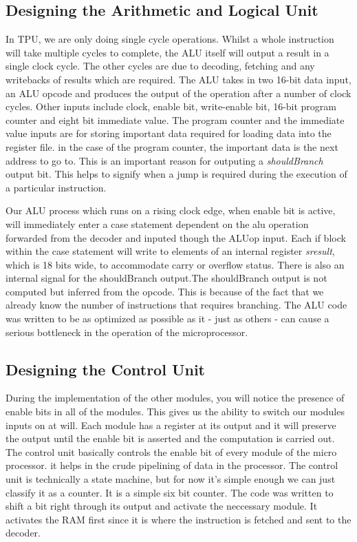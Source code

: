 \subsection{Designing the Arithmetic and Logical Unit}

In TPU, we are only doing single cycle operations. Whilst a whole instruction will take multiple cycles to complete, the ALU itself will output a result in a single clock cycle. The other cycles are due to decoding, fetching and any writebacks of results which are required. The ALU takes in two 16-bit data input, an ALU opcode and produces the output of the operation after a number of clock cycles. 
Other inputs include clock, enable bit, write-enable bit, 16-bit program counter and eight bit immediate value. The program counter and the immediate value inputs are for storing important data required for loading data into the register file. in the case of the program counter, the important data is the next address to go to. This is an important reason for outputing a \textit{shouldBranch} output bit. This helps to signify when a jump is required during the execution of a particular instruction.

Our ALU process which runs on a rising clock edge, when enable bit is active, will immediately enter a case statement dependent on the alu operation forwarded from the decoder and inputed though the ALUop input. 
Each if block within the case statement will write to elements of an internal register \textit{sresult}, which is 18 bits wide, to accommodate carry or overflow status. There is also an internal signal for the shouldBranch output.The shouldBranch output is not computed but inferred from the opcode. This is because of the fact that we already know the number of instructions that requires branching. 
The ALU code was written to be as optimized as possible as it - just as others - can cause a serious bottleneck in the operation of the microprocessor.





\subsection{Designing the Control Unit}
During the implementation of the other modules, you will notice the presence of enable bits in all of the modules. This gives us the ability to switch our modules inputs on at will. Each module has a register at its output and it will preserve the output until the enable bit is asserted and the computation is carried out.  
The control unit basically controls the enable bit of every module of the micro processor. it helps in the crude pipelining of data in the processor. 
The control unit is technically a state machine, but for now it’s simple enough we can just classify it as a counter. It is a simple six bit counter. The code was written to shift a bit right through its output and activate the neccessary module. It activates the RAM first since it is where the instruction is fetched and sent to the decoder.







